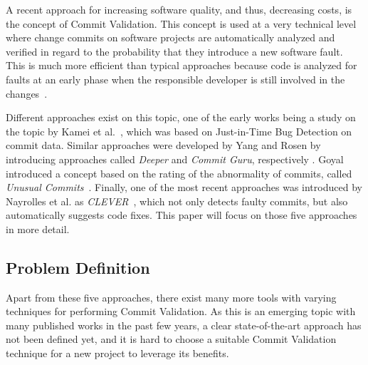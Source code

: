A recent approach for increasing software quality, and thus, decreasing costs, is the concept of Commit Validation. This concept is used at a very technical level where change commits on software projects are automatically analyzed and verified in regard to the probability that they introduce a new software fault. This is much more efficient than typical approaches because code is analyzed for faults at an early phase when the responsible developer is still involved in the changes~\cite{Kamei2013}.

Different approaches exist on this topic,
one of the early works being a study on the topic by Kamei et al.~\cite{Kamei2013}, which was based on Just-in-Time Bug Detection on commit data. Similar approaches were developed by Yang and Rosen by introducing approaches called \textit{Deeper} and \textit{Commit Guru}, respectively \cite{Yang2015,Rosen2015}. Goyal introduced a concept based on the rating of the abnormality of commits, called \textit{Unusual Commits}~\cite{Goyal2017}. Finally, one of the most recent approaches was introduced by Nayrolles et al. as \textit{CLEVER}~\cite{Nayrolles2018}, which not only detects faulty commits, but also automatically suggests code fixes. This paper will focus on those five approaches in more detail.

\subsection{Problem Definition}

Apart from these five approaches, there exist many more tools with varying techniques for performing Commit Validation.
As this is an emerging topic with many published works in the past few years, a clear state-of-the-art approach has not been defined yet, and it is hard to choose a suitable Commit Validation technique for a new project to leverage its benefits. 


